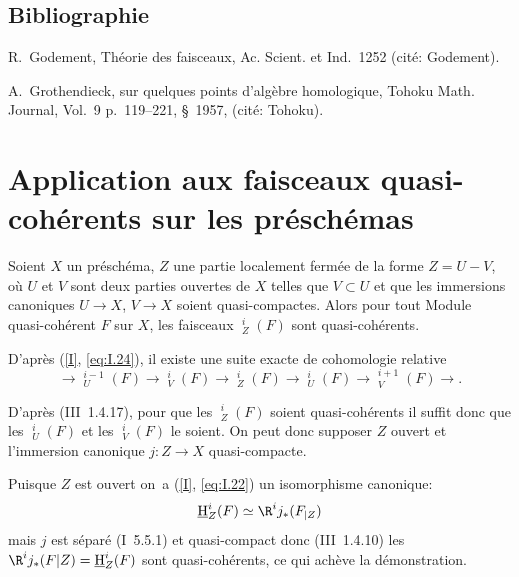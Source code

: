 %
\section*{Bibliographie}
\noindent
R.\, Godement, Th\'eorie des faisceaux, Ac. Scient. et Ind.~1252 (cit\'e: Godement).
\par\smallskip\noindent
A.\, Grothendieck, sur quelques points d'alg\`ebre homologique, Tohoku Math. Journal, Vol.~9 p.\, 119--221, \S~1957, (cit\'e: Tohoku).


\chapter[Faisceaux quasi-coh\'erents sur les pr\'esch\'emas]{Application aux faisceaux quasi-coh\'erents sur les pr\'esch\'emas} \label{II}

\makeatletter{}\makeatother{}

\begin{supproposition} \label{II.1}
Soient $X$ un pr\'esch\'ema, $Z$ une partie localement ferm\'ee de la forme $Z=U-V$, o\`u $U$ et $V$ sont deux parties ouvertes de $X$ telles que $V\subset U$ et que les immersions canoniques $U\to X$, $V\to X$ soient quasi-compactes. Alors pour tout Module quasi-coh\'erent $F$ sur $X$, les faisceaux ${\mathop{\underline{\mathrm{H}}}\nolimits}_Z^i(F)$ sont quasi-coh\'erents.
\end{supproposition}

D'apr\`es (\ref{I}, \ref{eq:I.24}), il existe une suite exacte de cohomologie relative
$$
\to {\mathop{\underline{\mathrm{H}}}\nolimits}_U^{i-1}(F) \to {\mathop{\underline{\mathrm{H}}}\nolimits}_V^{i}(F) \to {\mathop{\underline{\mathrm{H}}}\nolimits}_Z^{i}(F) \to {\mathop{\underline{\mathrm{H}}}\nolimits}_U^{i}(F) \to {\mathop{\underline{\mathrm{H}}}\nolimits}_V^{i+1}(F) \to.
$$

D'apr\`es (\EGA III~1.4.17), pour que les ${\mathop{\underline{\mathrm{H}}}\nolimits}_Z^i(F)$ soient quasi-coh\'erents il suffit donc que les ${\mathop{\underline{\mathrm{H}}}\nolimits}_U^i(F)$ et les ${\mathop{\underline{\mathrm{H}}}\nolimits}_V^i(F)$ le soient. On peut donc supposer $Z$ ouvert et l'immersion canonique $j:Z\to X$ quasi-compacte.

Puisque $Z$ est ouvert on~a (\ref{I}, \ref{eq:I.22}) un isomorphisme canonique:
$$
{\mathop{\underline{\mathrm{H}}}\nolimits}_Z^{i}(F) \simeq \R^ij_{*}(F_{|Z})
$$
mais $j$ est s\'epar\'e (\EGA I~5.5.1) et quasi-compact donc (\EGA III~1.4.10) les $\R^ij_{*}(F|Z)={\mathop{\underline{\mathrm{H}}}\nolimits}_Z^{i}(F)$ sont quasi-coh\'erents, ce qui ach\`eve la d\'emonstration.

